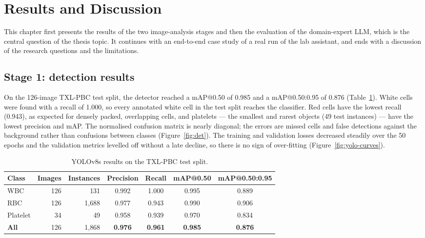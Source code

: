 \section{Results and Discussion}\label{sec:results}

This chapter first presents the results of the two image-analysis stages and then the evaluation of the domain-expert LLM, which is the central question of the thesis topic. It continues with an end-to-end case study of a real run of the lab assistant, and ends with a discussion of the research questions and the limitations.

\subsection{Stage 1: detection results}

On the 126-image TXL-PBC test split, the detector reached a mAP@0.50 of 0.985 and a mAP@0.50:0.95 of 0.876 (Table~\ref{tab:det}). White cells were found with a recall of 1.000, so every annotated white cell in the test split reaches the classifier. Red cells have the lowest recall (0.943), as expected for densely packed, overlapping cells, and platelets --- the smallest and rarest objects (49 test instances) --- have the lowest precision and mAP. The normalised confusion matrix is nearly diagonal; the errors are missed cells and false detections against the background rather than confusions between classes (Figure~\ref{fig:det}). The training and validation losses decreased steadily over the 50 epochs and the validation metrics levelled off without a late decline, so there is no sign of over-fitting (Figure~\ref{fig:yolo-curves}).

\begin{table}[H]
\centering
\caption{YOLOv8s results on the TXL-PBC test split.}
\label{tab:det}
\small
\begin{tabular}{lrrcccc}
\toprule
\textbf{Class} & \textbf{Images} & \textbf{Instances} & \textbf{Precision} & \textbf{Recall} & \textbf{mAP@0.50} & \textbf{mAP@0.50:0.95} \\
\midrule
WBC & 126 & 131 & 0.992 & 1.000 & 0.995 & 0.889 \\
RBC & 126 & 1{,}688 & 0.977 & 0.943 & 0.990 & 0.906 \\
Platelet & 34 & 49 & 0.958 & 0.939 & 0.970 & 0.834 \\
\midrule
\textbf{All} & 126 & 1{,}868 & \textbf{0.976} & \textbf{0.961} & \textbf{0.985} & \textbf{0.876} \\
\bottomrule
\end{tabular}
\end{table}

